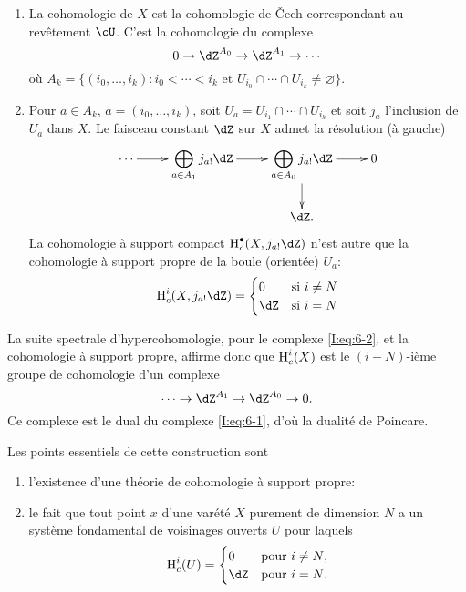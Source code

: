 \begin{enumerate}[\indent A]
  \item La cohomologie de $X$ est la cohomologie de \v Cech correspondant au 
    revêtement $\cU$. C'est la cohomologie du complexe 
    \begin{equation}\label{I:eq:6-1}
      0 \to \dZ^{A_0} \to \dZ^{A_1} \to \cdots
    \end{equation}
    où $A_k=\{(i_0,\dotsc,i_k) : i_0<\cdots<i_k\text{ et } U_{i_0}\cap \cdots \cap U_{i_k} \ne \varnothing\}$. 
    \item Pour $a\in A_k$, $a=(i_0,\dotsc,i_k)$, soit 
      $U_a=U_{i_1}\cap \cdots \cap U_{i_k}$ et soit $j_a$ l'inclusion de $U_a$ 
      dans $X$. Le faisceau constant $\dZ$ sur $X$ admet la résolution (à 
      gauche) 
      \begin{equation}\label{I:eq:6-2}
      \xymatrix{
        \cdots \ar[r]
          & \displaystyle\bigoplus_{a\in A_1} j_{a!}\dZ \ar[r] 
          & \displaystyle\bigoplus_{a\in A_0} j_{a!} \dZ \ar[r] \ar[d] 
          & 0 \\
        & & \dZ \text{.}
      }
      \end{equation}
      La cohomologie à support compact $\h_c^\bullet(X,j_{a!}\dZ)$ n'est autre 
      que la cohomologie à support propre de la boule (orientée) $U_a$: 
        \[
          \h_c^i(X,j_{a!}\dZ) = \begin{cases}
                                  0   & \text{si $i\ne N$} \\
                                  \dZ & \text{si $i = N$}
                                \end{cases}
        \]
\end{enumerate}

La suite spectrale d'hypercohomologie, pour le complexe \eqref{I:eq:6-2}, et la 
cohomologie \`a support propre, affirme donc que $\operatorname{H}_c^i(X)$ est le 
$(i-N)$-i\`eme groupe de cohomologie d'un complexe 
\begin{equation}\label{I:eq:6-3}
  \cdots \to \dZ^{A_1} \to \dZ^{A_0} \to 0 \text{.}
\end{equation}
Ce complexe est le dual du complexe \eqref{I:eq:6-1}, d'o\`u la dualit\'e de 
Poincare.

Les points essentiels de cette construction sont 
\begin{enumerate}[\indent a)]
  \item l'existence d'une théorie de cohomologie à support propre: 
  \item le fait que tout point $x$ d'une varété $X$ purement de dimension 
    $N$ a un système fondamental de voisinages ouverts $U$ pour laquels 
    \begin{equation}\label{I:eq:6-4}
      \h_c^i(U) = \begin{cases}
                    0   & \text{pour $i\ne N$,} \\
                    \dZ & \text{pour $i=N$.}
                  \end{cases}
    \end{equation}
\end{enumerate}

